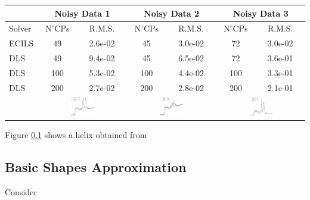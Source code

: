 \documentclass[a4paper,12pt]{article}
\begin{document}
 
 
 
 \begin{table}
  \begin{tabular}{|l |cc |cc| cc|}
  \hline
  &\multicolumn{2}{c|}{{Noisy Data 1}}&\multicolumn{2}{c|}{{Noisy Data 2}}&\multicolumn{2}{c|}{{Noisy Data 3}}\\
  \hline
Solver& $\text{N}^\circ $CPs&R.M.S.&$\text{N}^\circ $CPs&R.M.S.&$\text{N}^\circ $CPs&R.M.S.\\   
\hline
ECILS & 49  & 2.6e-02	& 45  &	3.0e-02	& 72  &	3.0e-02\\
\hline
DLS   & 49  & 9.4e-02	& 45  &	6.5e-02	& 72  &	3.6e-01\\
DLS   & 100 & 5.3e-02	& 100 &	4.4e-02	& 100 &	3.3e-01\\
DLS   & 200 & 2.7e-02	& 200 &	2.8e-02	& 200 &	2.1e-01\\
\hline
&\multicolumn{2}{c|}{\includegraphics[width=0.29\textwidth]{noise1}}
 &\multicolumn{2}{c|}{\includegraphics[width=0.29\textwidth]{noise2}}
 &\multicolumn{2}{c|}{\includegraphics[width=0.29\textwidth]{noise3}}\\
\hline
  \end{tabular}

 \end{table}



 
 Figure \ref{} shows a helix obtained from \subsection{Basic Shapes Approximation}
 Consider
 
 



   
   
  





 
 
 

 
 
\end{document}
